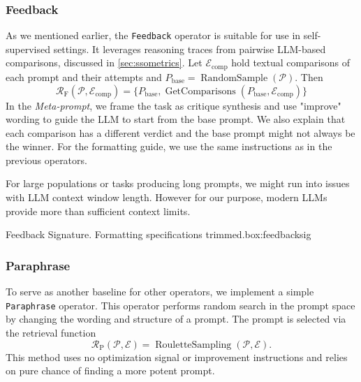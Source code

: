 \subsubsection{Feedback}
As we mentioned earlier, the \texttt{Feedback} operator is suitable for use in self-supervised settings.
It leverages reasoning traces from pairwise LLM-based comparisons, discussed in \ref{sec:ssometrics}. 
Let $\mathcal{E}_{\text{comp}}$ hold textual comparisons of each prompt and their attempts and
$P_{\text{base}} = \operatorname{RandomSample}(\mathscr{P})$. Then
\begin{equation}
    \mathcal{R}_{\text{F}}(\mathscr{P}, \mathcal{E}_{\text{comp}}) = \{P_{\text{base}}, \operatorname{GetComparisons}(P_{\text{base}}, \mathcal{E}_{\text{comp}})\}
\end{equation}
In the \textit{Meta-prompt}, we frame the task as critique synthesis and use "improve" wording to guide the LLM to start from the base prompt.
We also explain that each comparison has a different verdict and the base prompt might not always be the winner. For the formatting guide, we use the same instructions
as in the previous operators.

For large populations or tasks producing long prompts, we might run into issues with LLM context window length. 
However for our purpose, modern LLMs provide more than sufficient context limits. 
\begin{figurebox}{Feedback Signature. Formatting specifications trimmed.}{box:feedbacksig}
\end{figurebox}

\subsubsection{Paraphrase}
To serve as another baseline for other operators, we implement a simple \texttt{Paraphrase} operator.
This operator performs random search in the prompt space by changing the wording and structure of a prompt.
The prompt is selected via the retrieval function
\begin{equation}
    \mathcal{R}_{\text{P}}(\mathscr{P}, \mathcal{E}) = \operatorname{RouletteSampling}(\mathscr{P}, \mathcal{E}).
\end{equation}
This method uses no optimization signal or improvement instructions and relies on pure chance of finding a more potent prompt.


